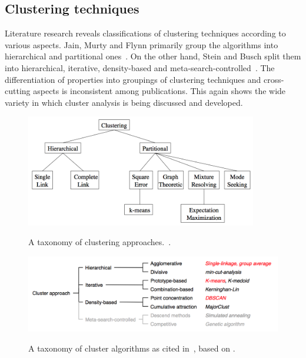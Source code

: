 \subsection{Clustering techniques}
\label{chapter:clustering-techniques}

Literature research reveals classifications of clustering techniques according to various aspects. Jain, Murty and Flynn primarily group the algorithms into hierarchical and partitional ones~\cite{Jain99clusterreview}. On the other hand, Stein and Busch split them into hierarchical, iterative, density-based and meta-search-controlled~\cite{Stein05density}. The differentiation of properties into groupings of clustering techniques and cross-cutting aspects is inconsistent among publications. This again shows the wide variety in which cluster analysis is being discussed and developed.

\begin{figure}[h]
  \begin{center}
    \includegraphics[width=0.9\textwidth]{figures/clustering_approaches_jain.png}
    \label{fig:clusters}
    \caption{A taxonomy of clustering approaches.~\cite[p 275]{Jain99clusterreview}.}
  \end{center}
\end{figure}

\begin{figure}[h]
  \begin{center}
    \includegraphics[width=1\textwidth]{figures/clustering_techniques_meert.png}
    \label{fig:clusters}
    \caption{A taxonomy of cluster algorithms as cited in~\cite[p 14]{Meert06clustermaps}, based on \cite{Stein05density}.}
  \end{center}
\end{figure}


